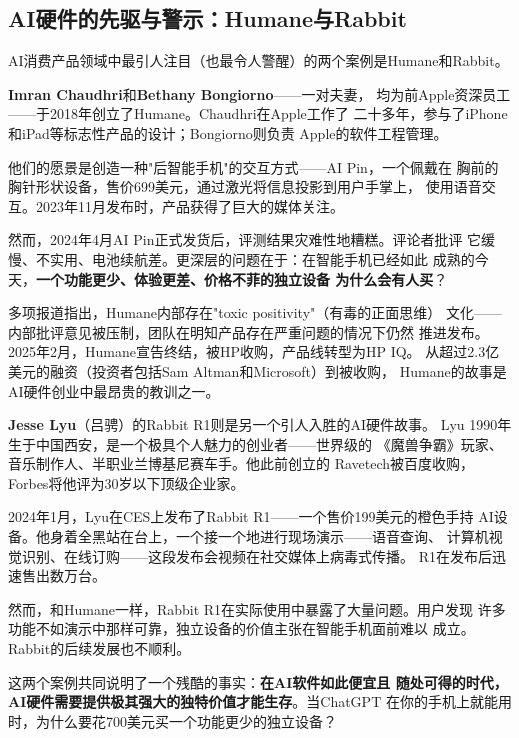 \subsection{AI硬件的先驱与警示：Humane与Rabbit}
\label{subsec:founders-hardware}

AI消费产品领域中最引人注目（也最令人警醒）的两个案例是Humane和Rabbit。

\textbf{Imran Chaudhri}和\textbf{Bethany Bongiorno}——一对夫妻，
均为前Apple资深员工——于2018年创立了Humane。Chaudhri在Apple工作了
二十多年，参与了iPhone和iPad等标志性产品的设计；Bongiorno则负责
Apple的软件工程管理。

他们的愿景是创造一种"后智能手机"的交互方式——AI Pin，一个佩戴在
胸前的胸针形状设备，售价699美元，通过激光将信息投影到用户手掌上，
使用语音交互。2023年11月发布时，产品获得了巨大的媒体关注。

然而，2024年4月AI Pin正式发货后，评测结果灾难性地糟糕。评论者批评
它缓慢、不实用、电池续航差。更深层的问题在于：在智能手机已经如此
成熟的今天，\textbf{一个功能更少、体验更差、价格不菲的独立设备
为什么会有人买}？

\begin{warnbox}[Humane的教训]
多项报道指出，Humane内部存在"toxic positivity"（有毒的正面思维）
文化——内部批评意见被压制，团队在明知产品存在严重问题的情况下仍然
推进发布。2025年2月，Humane宣告终结，被HP收购，产品线转型为HP IQ。
从超过2.3亿美元的融资（投资者包括Sam Altman和Microsoft）到被收购，
Humane的故事是AI硬件创业中最昂贵的教训之一。
\end{warnbox}

\textbf{Jesse Lyu}（吕骋）的Rabbit R1则是另一个引人入胜的AI硬件故事。
Lyu 1990年生于中国西安，是一个极具个人魅力的创业者——世界级的
《魔兽争霸》玩家、音乐制作人、半职业兰博基尼赛车手。他此前创立的
Ravetech被百度收购，Forbes将他评为30岁以下顶级企业家。

2024年1月，Lyu在CES上发布了Rabbit R1——一个售价199美元的橙色手持
AI设备。他身着全黑站在台上，一个接一个地进行现场演示——语音查询、
计算机视觉识别、在线订购——这段发布会视频在社交媒体上病毒式传播。
R1在发布后迅速售出数万台。

然而，和Humane一样，Rabbit R1在实际使用中暴露了大量问题。用户发现
许多功能不如演示中那样可靠，独立设备的价值主张在智能手机面前难以
成立。Rabbit的后续发展也不顺利。

这两个案例共同说明了一个残酷的事实：\textbf{在AI软件如此便宜且
随处可得的时代，AI硬件需要提供极其强大的独特价值才能生存}。当ChatGPT
在你的手机上就能用时，为什么要花700美元买一个功能更少的独立设备？

